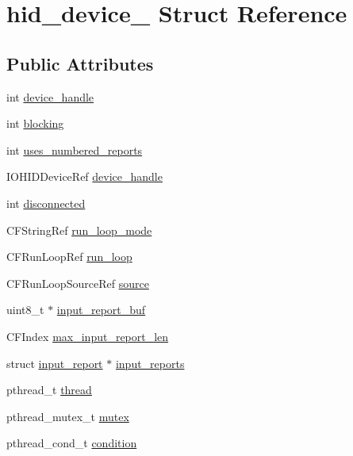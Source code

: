 \hypertarget{structhid__device__}{\section{hid\-\_\-device\-\_\- Struct Reference}
\label{structhid__device__}
}
\subsection*{Public Attributes}
\begin{DoxyCompactItemize}
\item 
int \hyperlink{structhid__device___acbcc48ecdd887f36390da3bb05a6d5d5}{device\-\_\-handle}
\item 
int \hyperlink{structhid__device___ae4a8b40297f31863df3133637cfa2121}{blocking}
\item 
int \hyperlink{structhid__device___a58ed6252074ed422235fe9e0c48aeafe}{uses\-\_\-numbered\-\_\-reports}
\item 
I\-O\-H\-I\-D\-Device\-Ref \hyperlink{structhid__device___add41d44d3e24fe6ea144cd849c12fea7}{device\-\_\-handle}
\item 
int \hyperlink{structhid__device___ae0b8006ed064c994acaa648d0db9c66c}{disconnected}
\item 
C\-F\-String\-Ref \hyperlink{structhid__device___ae7e03e58cc35fc010258eae347f46cda}{run\-\_\-loop\-\_\-mode}
\item 
C\-F\-Run\-Loop\-Ref \hyperlink{structhid__device___a329285cce8a31c8531cdb120e8a39b89}{run\-\_\-loop}
\item 
C\-F\-Run\-Loop\-Source\-Ref \hyperlink{structhid__device___a3133e1c1a6481521f627e01e131614cb}{source}
\item 
uint8\-\_\-t $\ast$ \hyperlink{structhid__device___ad091d91b13392da40451462061a11a90}{input\-\_\-report\-\_\-buf}
\item 
C\-F\-Index \hyperlink{structhid__device___a6ec557e969d5d01de9c5ac03fe813793}{max\-\_\-input\-\_\-report\-\_\-len}
\item 
struct \hyperlink{structinput__report}{input\-\_\-report} $\ast$ \hyperlink{structhid__device___a8f381b0e4fcb4c6c34c4371e131ae718}{input\-\_\-reports}
\item 
pthread\-\_\-t \hyperlink{structhid__device___aeeb2baed80ebbceec2bdd31353917df2}{thread}
\item 
pthread\-\_\-mutex\-\_\-t \hyperlink{structhid__device___a9833b66e88e2e6d057cc3ba48b304e81}{mutex}
\item 
pthread\-\_\-cond\-\_\-t \hyperlink{structhid__device___ac1e660212fdb3880218c7976ac834ad7}{condition}

\end{DoxyCompactItemize}
